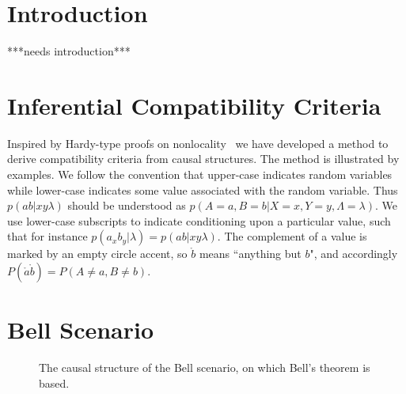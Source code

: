 \section{Introduction}
***needs introduction***


\section{Inferential Compatibility Criteria}
Inspired by Hardy-type proofs on nonlocality~\cite{L.Hardy:PRL:1665,CabelloHardyInequality,LSW} we have developed a method to derive compatibility criteria from causal structures. The method is illustrated by examples.
We follow the convention that upper-case indicates random variables while lower-case indicates some value associated with the random variable. Thus $p(ab|xy\lambda)$ should be understood as ${p(A\mathopen{=}a,B\mathopen{=}b|X\mathopen{=}x,Y\mathopen{=}y,\Lambda\mathopen{=}\lambda)}$. We use lower-case subscripts to indicate conditioning upon a particular value, such that for instance $p(a_x b_y|\lambda)=p(ab|xy\lambda)$. The complement of a value is marked by an empty circle accent, so $\mathring{b}$ means ``anything but $b$", and accordingly $P(\mathring{a}\mathring{b})=P(A\mathopen{\neq}a,B\mathopen{\neq}b)$.

\section{Bell Scenario}
\begin{figure}[b!]
\caption{The causal structure of the Bell scenario, on which Bell's theorem is based.}
 \label{fig:BellDAG}
\end{figure}

